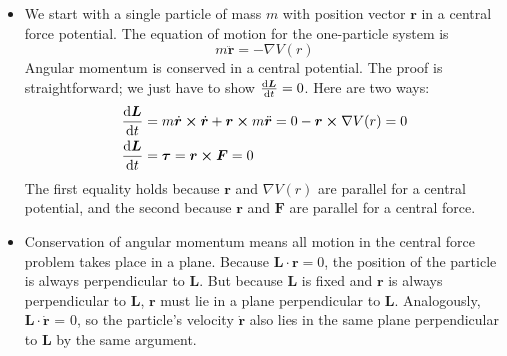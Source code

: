 \documentclass[11pt, a4paper]{article}
\newcommand{\bdot}[1]{\dot{\bm{#1}}}
\newcommand{\bddot}[1]{\ddot{\bm{#1}}}
\renewcommand{\grad}{\nabla }
\begin{document}
\begin{itemize}
	\item We start with a single particle of mass $ m $ with position vector $ \bm{r} $ in a central force potential. The equation of motion for the one-particle system is
	\begin{equation*}
		m \ddot{\bm{r}} = - \grad V(r)
	\end{equation*}
	Angular momentum is conserved in a central potential. The proof is straightforward; we just have to show $ \dv{\bm{L}}{t} = 0 $. Here are two ways:
	\begin{align*}
		&\dv{\bm{L}}{t} = m \bdot{r} \cross \bdot{r} + \bm{r} \cross m \bddot{r} = 0 - \bm{r} \cross \grad{V}(r) = 0\\
		&\dv{\bm{L}}{t} = \bm{\tau} = \bm{r} \cross \bm{F} = 0
	\end{align*}
	The first equality holds because $ \bm{r} $ and $ \grad{V}(r) $ are parallel for a central potential, and the second because $ \bm{r} $ and $ \bm{F} $ are parallel for a central force.
	
	\item Conservation of angular momentum means all motion in the central force problem takes place in a plane. Because $ \bm{L} \cdot \bm{r} = 0 $, the position of the particle is always perpendicular to $ \bm{L} $. But because $ \bm{L} $ is fixed and $ \bm{r} $ is always perpendicular to $ \bm{L} $, $ \bm{r} $ must lie in a plane perpendicular to $ \bm{L} $. Analogously, $ \bm{L} \cdot \bdot{r} $ = 0, so the particle's velocity $ \bdot{r} $ also lies in the same plane perpendicular to $ \bm{L} $ by the same argument.
	

\end{itemize}
\end{document}
